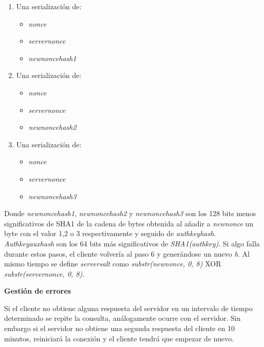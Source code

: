 \begin{enumerate}
	\begin{enumerate}
		\item Una serialización de: 
			\begin{itemize}
				\item \emph{nonce}
				\item \emph{server\textunderscore nonce}
				\item \emph{new\textunderscore nonce\textunderscore hash1}
			\end{itemize}
		\item Una serialización de:
			\begin{itemize}
				\item \emph{nonce}	
				\item \emph{server\textunderscore nonce}
				\item \emph{new\textunderscore nonce\textunderscore hash2}
			\end{itemize}
		\item Una serialización de:
			\begin{itemize}
				\item \emph{nonce}	
				\item \emph{server\textunderscore nonce}
				\item \emph{new\textunderscore nonce\textunderscore hash3}
			\end{itemize}
	\end{enumerate}
	Donde \emph{new\textunderscore nonce\textunderscore hash1}, \emph{new\textunderscore nonce\textunderscore hash2} y \emph{new\textunderscore nonce\textunderscore hash3} son los 128 bits menos significativos de SHA1 de la cadena de bytes obtenida al añadir a \emph{new\textunderscore nonce} un byte con el valor 1,2 o 3 respectivamente y seguido de \emph{auth\textunderscore key\textunderscore hash}.\\
	\emph{Auth\textunderscore key\textunderscore aux\textunderscore hash} son los 64 bits más significativos de \emph{SHA1(auth\textunderscore key)}.
	Si algo falla durante estos pasos, el cliente volvería al paso 6 y generándose un nuevo \emph{b}. Al mismo tiempo se define \emph{server\textunderscore salt} como \emph{substr(new\textunderscore nonce, 0, 8)} XOR \emph{substr(server\textunderscore nonce, 0, 8)}.\\
	
\end{enumerate}
\textbf{Gestión de errores}

Si el cliente no obtiene alguna respuesta del servidor en un intervalo de tiempo determinado se repite la consulta, análogamente ocurre con el servidor. Sin embargo si el servidor no obtiene una segunda respuesta del cliente en 10 minutos, reiniciará la conexión y el cliente tendrá que empezar de nuevo.

